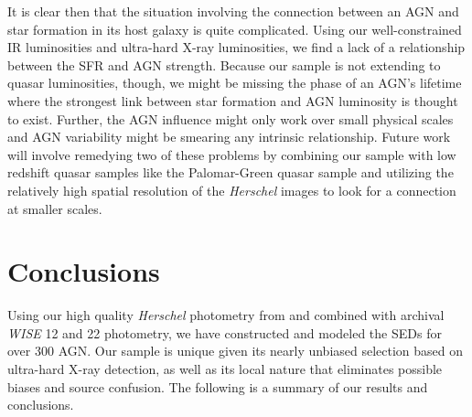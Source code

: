 \documentclass[fleqn, usenatbib]{mnras}
\newcommand{\herschel}{\emph{Herschel}}
\begin{document}

It is clear then that the situation involving the connection between an AGN and star formation in its host galaxy is quite complicated. Using our well-constrained IR luminosities and ultra-hard X-ray luminosities, we find a lack of a relationship between the SFR and AGN strength. Because our sample is not extending to quasar luminosities, though, we might be missing the phase of an AGN's lifetime where the strongest link between star formation and AGN luminosity is thought to exist. Further, the AGN influence might only work over small physical scales and AGN variability might be smearing any intrinsic relationship. Future work will involve remedying two of these problems by combining our sample with low redshift quasar samples like the Palomar-Green quasar sample and utilizing the relatively high spatial resolution of the \herschel{} images to look for a connection at smaller scales. 

\section{Conclusions}
Using our high quality \herschel{} photometry from \citet{Melendez:2014yu} and \citet{Shimizu:2016qy} combined with archival \textit{WISE} 12 and 22 \micron{} photometry, we have constructed and modeled the SEDs for over 300 AGN. Our sample is unique given its nearly unbiased selection based on ultra-hard X-ray detection, as well as its local nature that eliminates possible biases and source confusion. The following is a summary of our results and conclusions.
\end{document}
